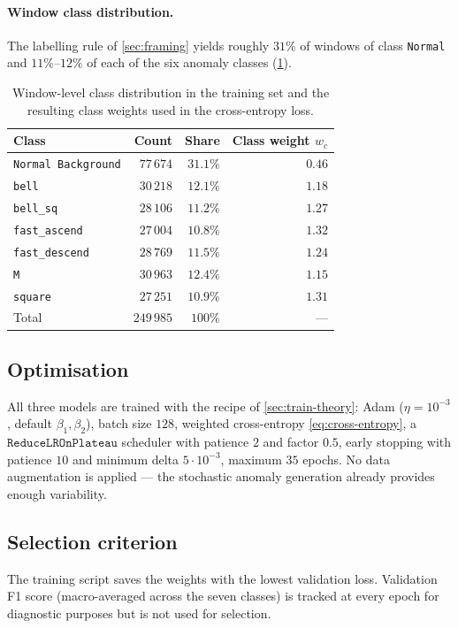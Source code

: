\paragraph{Window class distribution.}
The labelling rule of \cref{sec:framing} yields roughly $31\%$ of
windows of class \texttt{Normal} and $11\%$--$12\%$ of each of the six
anomaly classes (\cref{tab:class-dist}).

\begin{table}[H]
    \centering
    \footnotesize
    \begin{tabular}{lrrr}
        \toprule
        Class & Count & Share & Class weight $w_c$ \\
        \midrule
        \texttt{Normal Background} & $77\,674$ & $31.1\%$ & $0.46$ \\
        \texttt{bell}              & $30\,218$ & $12.1\%$ & $1.18$ \\
        \texttt{bell\_sq}          & $28\,106$ & $11.2\%$ & $1.27$ \\
        \texttt{fast\_ascend}      & $27\,004$ & $10.8\%$ & $1.32$ \\
        \texttt{fast\_descend}     & $28\,769$ & $11.5\%$ & $1.24$ \\
        \texttt{M}                 & $30\,963$ & $12.4\%$ & $1.15$ \\
        \texttt{square}            & $27\,251$ & $10.9\%$ & $1.31$ \\
        \midrule
        Total                       & $249\,985$ & $100\%$ & --- \\
        \bottomrule
    \end{tabular}
    \caption{Window-level class distribution in the training set and
    the resulting class weights used in the cross-entropy loss.}
    \label{tab:class-dist}
\end{table}

\subsection{Optimisation}

All three models are trained with the recipe of
\cref{sec:train-theory}: Adam ($\eta=10^{-3}$, default
$\beta_1, \beta_2$), batch size $128$, weighted cross-entropy
\cref{eq:cross-entropy}, a $\texttt{ReduceLROnPlateau}$ scheduler with
patience $2$ and factor $0.5$, early stopping with patience $10$ and
minimum delta $5 \cdot 10^{-3}$, maximum $35$ epochs. No data
augmentation is applied --- the stochastic anomaly generation already
provides enough variability.

\subsection{Selection criterion}

The training script saves the weights with the lowest validation loss.
Validation F1 score (macro-averaged across the seven classes) is
tracked at every epoch for diagnostic purposes but is not used for
selection.
